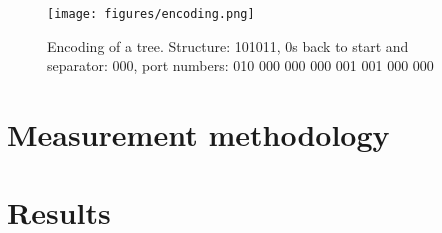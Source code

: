 \documentclass{article}
\begin{document}
\begin{figure}
  \centering
  \texttt{[image: figures/encoding.png]}
  \caption{Encoding of a tree. Structure: 101011, 0s back to start and separator: 000, port numbers: 010 000 000 000 001 001 000 000}
  \label{fig:encoding}
\end{figure}

\section{Measurement methodology}
\label{sec:method}


\section{Results}
\label{sec:results}

\end{document}
